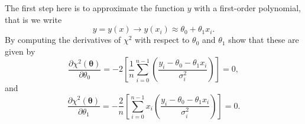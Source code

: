 \documentclass[%
oneside,                 %
final,                   %
10pt]{article}
\newenvironment{block_mdfboxadmon}[1][]{
\begin{block_mdfboxmdframed}[frametitle=#1]
}
{
\end{block_mdfboxmdframed}
}
\begin{document}

\begin{block_mdfboxadmon}[]
The first step here is to approximate the function $y$ with a first-order polynomial, that is we write
\[
y=y(x) \rightarrow y(x_i) \approx \theta_0+\theta_1 x_i.
\]
By computing the derivatives of $\chi^2$ with respect to $\theta_0$ and $\theta_1$ show that these are given by
\[
\frac{\partial \chi^2(\bm{\theta})}{\partial \theta_0} = -2\left[ \frac{1}{n}\sum_{i=0}^{n-1}\left(\frac{y_i-\theta_0-\theta_1x_{i}}{\sigma_i^2}\right)\right]=0,
\]
and
\[
\frac{\partial \chi^2(\bm{\theta})}{\partial \theta_1} = -\frac{2}{n}\left[ \sum_{i=0}^{n-1}x_i\left(\frac{y_i-\theta_0-\theta_1x_{i}}{\sigma_i^2}\right)\right]=0.
\]
\end{block_mdfboxadmon} %




\end{document}
